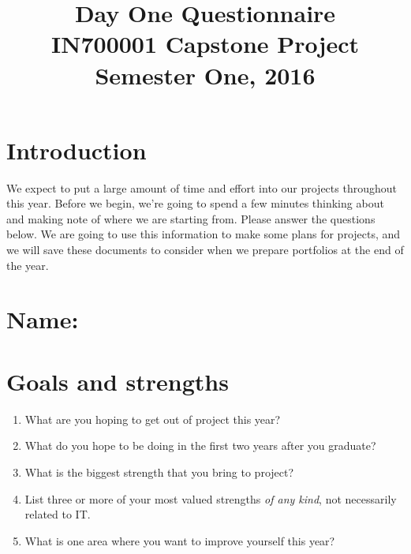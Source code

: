 \documentclass{article}
\begin{document}
\title{Day One Questionnaire\\IN700001 Capstone Project \\Semester One, 2016}
\date{}
\maketitle

\section*{Introduction}
We expect to put a large amount of time and effort into our projects throughout this year. Before we begin, we're going to spend a few minutes thinking about and making note of where we are starting from.  Please answer the questions below. We are going to use this information to make some plans for projects, and we will save these documents to consider when we prepare portfolios at the end of the year.

\section*{Name:}

\vspace{5mm}

\section*{Goals and strengths}

\begin{enumerate}
	\item What are you hoping to get out of project this year?
	\vspace{25mm}
	
	\item What do you hope to be doing in the first two years after you graduate?
	\vspace{25mm}
	
	\item What is the biggest strength that you bring to project?
	\vspace{25mm}
	
	\item List three or more of your most valued strengths \emph{of any kind}, not necessarily related to IT.
	\vspace{25mm}
	
	\item What is one area where you want to improve yourself this year?
	\vspace{25mm}
	
	
\end{enumerate}
\end{document}
